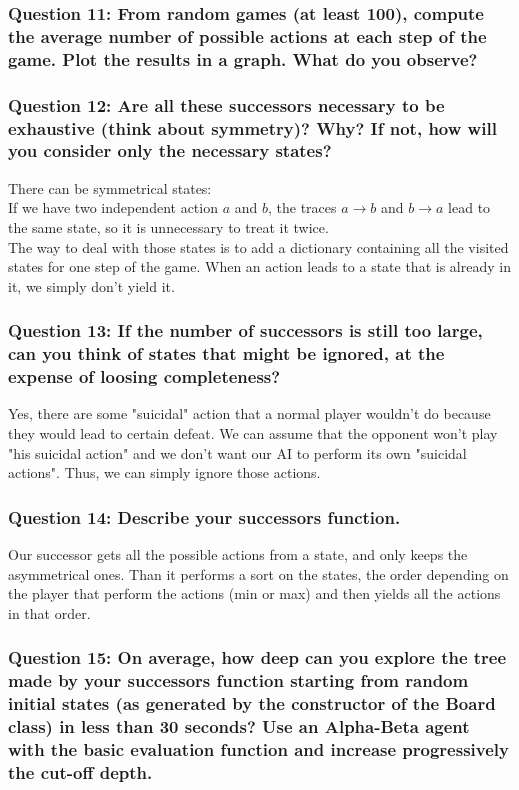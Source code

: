 \documentclass[a4paper,10pt]{article}
\begin{document}
				\subsubsection{Question 11: From random games (at least 100), compute the average number of possible
actions at each step of the game. Plot the results in a graph. What do you observe?}
					
				\subsubsection{Question 12: Are all these successors necessary to be exhaustive (think about symmetry)? Why? If not, how will you consider only the necessary states?}
					There can be symmetrical states:\\
					If we have two independent action $a$ and $b$, the traces $a\rightarrow b$ and $b\rightarrow a$ lead to the same state, so it is unnecessary to treat it twice.\\
					The way to deal with those states is to add a dictionary containing all the visited states for one step of the game. When an action leads to a state that is already in it, we simply don't yield it.
				\subsubsection{Question 13: If the number of successors is still too large, can you think of states that might be ignored, at the expense of loosing completeness?}
					Yes, there are some "suicidal" action that a normal player wouldn't do because they would lead to certain defeat. We can assume that the opponent won't play "his suicidal action" and we don't want our AI to perform its own "suicidal actions". Thus, we can simply ignore those actions.
				\subsubsection{Question 14: Describe your successors function.}
					Our successor gets all the possible actions from a state, and only keeps the asymmetrical ones. Than it performs a sort on the states, the order depending on the player that perform the actions (min or max) and then yields all the actions in that order.
				\subsubsection{Question 15: On average, how deep can you explore the tree made by your successors function starting from random initial states (as generated by the constructor of the Board class) in less than 30 seconds? Use an Alpha-Beta agent with the basic evaluation function and increase progressively the cut-off depth.}
				
\end{document}
